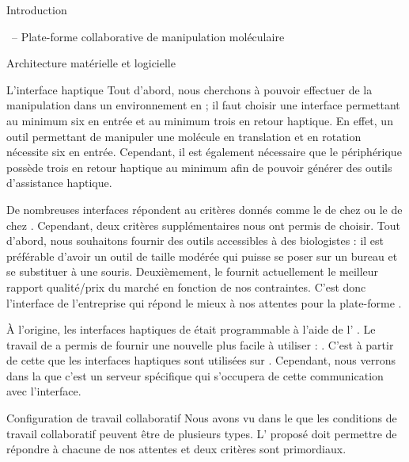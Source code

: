 \documentclass[myfrancais]{mythesis}
\begin{document}
\begin{mypart}{Introduction}
\begin{mychapter}{\myShaddock\ -- Plate-forme collaborative de manipulation moléculaire}
\begin{mysection}{Architecture matérielle et logicielle}
\begin{mysubsection}{L'interface haptique}
					Tout d'abord, nous cherchons à pouvoir effectuer de la manipulation dans un environnement en \myThreeD; il faut choisir une interface permettant au minimum six  en entrée et au minimum trois  en retour haptique.
					En effet, un outil permettant de manipuler une molécule en translation et en rotation nécessite six  en entrée.
					Cependant, il est également nécessaire que le périphérique possède trois  en retour haptique au minimum afin de pouvoir générer des outils d'assistance haptique.

					De nombreuses interfaces répondent au critères donnés comme le \myPremium de chez \mySensAble ou le \myVirtuose de chez \myHaption.
					Cependant, deux critères supplémentaires nous ont permis de choisir.
					Tout d'abord, nous souhaitons fournir des outils accessibles à des biologistes : il est préférable d'avoir un outil de taille modérée qui puisse se poser sur un bureau et se substituer à une souris.
					Deuxièmement, le \myOmni fournit actuellement le meilleur rapport qualité/prix du marché en fonction de nos contraintes.
					C'est donc l'interface \myOmni {} de l'entreprise \mySensAble qui répond le mieux à nos attentes pour la plate-forme \myShaddock {}.

					\begin{myfigure}
					\end{myfigure}

					À l'origine, les interfaces haptiques de \mySensAble était programmable à l'aide de l' \myGhost {}.
					Le travail de  a permis de fournir une nouvelle  plus facile à utiliser : \myOpenHaptics.
					C'est à partir de cette  que les interfaces haptiques sont utilisées sur \myShaddock.
					Cependant, nous verrons dans la  que c'est un serveur spécifique qui s'occupera de cette communication avec l'interface.
				\end{mysubsection}
				\begin{mysubsection}{Configuration de travail collaboratif}
					Nous avons vu dans le  que les conditions de travail collaboratif peuvent être de plusieurs types.
					L' proposé doit permettre de répondre à chacune de nos attentes et deux critères sont primordiaux.
					

\end{mysubsection}
\end{mysection}
\end{mychapter}
\end{mypart}
\end{document}
